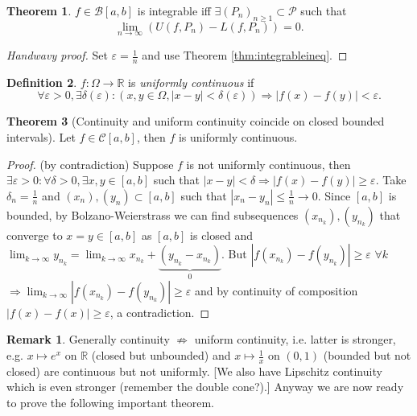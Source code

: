 \documentclass[a4paper]{article}
\theoremstyle{definition}
\newtheorem{defn}{Definition}[subsection]
\newtheorem{thm}[defn]{Theorem}
\newtheorem*{remark}{Remark}
\begin{document}
\begin{thm}
	$f\in \mathcal B [a,b]$ is integrable iff $\exists (P_n)_{n\geq 1} \subset \mathcal P$ such that
\[
\lim_{n\rightarrow \infty} (U(f,P_n)-L(f,P_n))=0 .
\]
\end{thm}

\begin{proof}
	[Handwavy proof] Set $\varepsilon =\frac1n$ and use Theorem \ref{thm:integrableineq}.
\end{proof}

\begin{defn}
\label{defn:unicont}
	$f:\Omega \rightarrow \mathbb R$ is \textit{uniformly continuous} if
\[
\forall \varepsilon >0, \exists \delta (\varepsilon): (x,y\in \Omega, |x-y|<\delta (\varepsilon)) \Rightarrow |f(x)-f(y)|<\varepsilon .
\]
\end{defn}

\begin{thm}[Continuity and uniform continuity coincide on closed bounded intervals]
\label{thm:closedboundedintcontisunicont}
	Let $f\in \mathcal C [a,b]$, then $f$ is uniformly continuous.
\end{thm}

\begin{proof}
	(by contradiction) Suppose $f$ is not uniformly continuous, then $\exists \varepsilon >0 : \forall \delta >0, \exists x,y \in [a,b]$ such that $|x-y|<\delta \Rightarrow |f(x)-f(y)|\geq \varepsilon .$ Take $\delta _n=\frac1n $ and $(x_n),(y_n) \subset [a,b]$ such that $|x_n-y_n|\leq \frac1n \rightarrow 0 .$ Since $[a,b]$ is bounded, by Bolzano-Weierstrass we can find subsequences $(x_{n_k}),(y_{n_k})$ that converge to $x=y \in [a,b]$ as $[a,b]$ is closed and $\lim_{k\rightarrow \infty} y_{n_k} = \lim_{k\rightarrow \infty} x_{n_k} + \underbrace{(y_{n_k}-x_{n_k})}_{0}$. But $|f(x_{n_k})-f(y_{n_k})|\geq \varepsilon$ $\forall k$ $\Rightarrow \lim_{k\rightarrow \infty} |f(x_{n_k})-f(y_{n_k})| \geq \varepsilon$ and by continuity of composition $|f(x)-f(x)|\geq \varepsilon$, a contradiction.
\end{proof}

\begin{remark}
	Generally continuity $\not\Rightarrow$ uniform continuity, i.e. latter is stronger, e.g. $x\mapsto e^x$ on $\mathbb R$ (closed but unbounded) and $x\mapsto \frac1x$ on $(0,1)$ (bounded but not closed) are continuous but not uniformly. [We also have Lipschitz continuity which is even stronger (remember the double cone?).] Anyway we are now ready to prove the following important theorem.
\end{remark}
\end{document}
